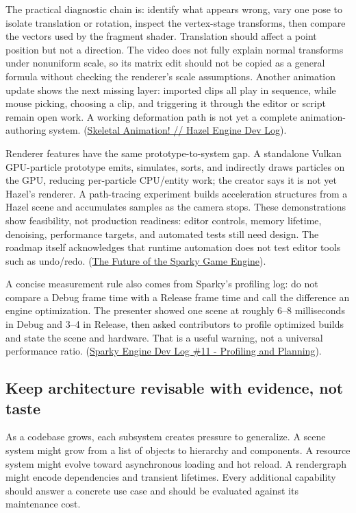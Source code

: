 The practical diagnostic chain is: identify what appears wrong, vary one pose to isolate translation or rotation, inspect the vertex-stage transforms, then compare the vectors used by the fragment shader. Translation should affect a point position but not a direction. The video does not fully explain normal transforms under nonuniform scale, so its matrix edit should not be copied as a general formula without checking the renderer's scale assumptions. Another animation update shows the next missing layer: imported clips all play in sequence, while mouse picking, choosing a clip, and triggering it through the editor or script remain open work. A working deformation path is not yet a complete animation-authoring system. (\href{https://www.youtube.com/watch?v=8-wAi--vW1o&t=4m18s}{Skeletal Animation! // Hazel Engine Dev Log}).

Renderer features have the same prototype-to-system gap. A standalone Vulkan GPU-particle prototype emits, simulates, sorts, and indirectly draws particles on the GPU, reducing per-particle CPU/entity work; the creator says it is not yet Hazel's renderer. A path-tracing experiment builds acceleration structures from a Hazel scene and accumulates samples as the camera stops. These demonstrations show feasibility, not production readiness: editor controls, memory lifetime, denoising, performance targets, and automated tests still need design. The roadmap itself acknowledges that runtime automation does not test editor tools such as undo/redo. (\href{https://www.youtube.com/watch?v=hUFHzuIyK0g&t=6m27s}{The Future of the Sparky Game Engine}).

A concise measurement rule also comes from Sparky's profiling log: do not compare a Debug frame time with a Release frame time and call the difference an engine optimization. The presenter showed one scene at roughly 6--8 milliseconds in Debug and 3--4 in Release, then asked contributors to profile optimized builds and state the scene and hardware. That is a useful warning, not a universal performance ratio. (\href{https://www.youtube.com/watch?v=cimYa67cR-U&t=6m30s}{Sparky Engine Dev Log \#11 - Profiling and Planning}).

\subsection{Keep architecture revisable with evidence, not taste}\label{06-engine-ii-ch041-keep-architecture-revisable-with-evidence-not-taste}

As a codebase grows, each subsystem creates pressure to generalize. A scene system might grow from a list of objects to hierarchy and components. A resource system might evolve toward asynchronous loading and hot reload. A rendergraph might encode dependencies and transient lifetimes. Every additional capability should answer a concrete use case and should be evaluated against its maintenance cost.

